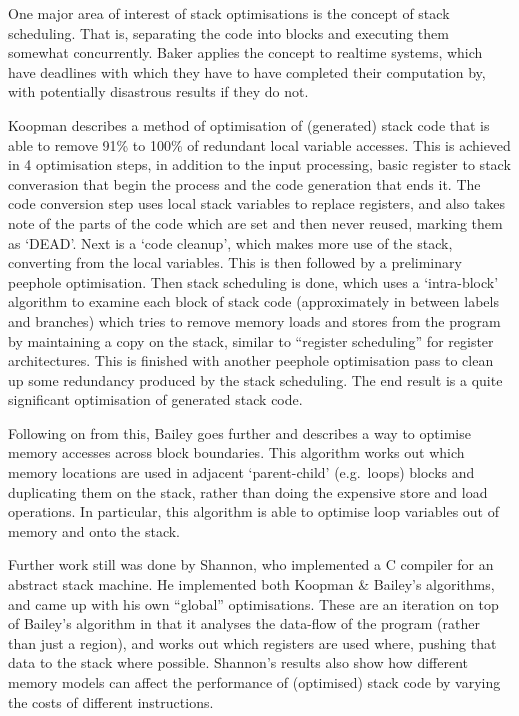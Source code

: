 One major area of interest of stack optimisations is the concept of stack
scheduling. That is, separating the code into blocks and executing them somewhat
concurrently. Baker applies the concept to realtime systems, which have
deadlines with which they have to have completed their computation by, with
potentially disastrous results if they do not.\cite{Baker1991Stack}

Koopman describes a method of optimisation of (generated) stack code that is
able to remove 91\% to 100\% of redundant local variable accesses. This is
achieved in 4 optimisation steps, in addition to the input processing, basic
register to stack converasion that begin the process and the code generation
that ends it. The code conversion step uses local stack variables to replace
registers, and also takes note of the parts of the code which are set and then
never reused, marking them as `DEAD'.  Next is a `code cleanup', which makes
more use of the stack, converting from the local variables. This is then
followed by a preliminary peephole optimisation. Then stack scheduling is done,
which uses a `intra-block' algorithm to examine each block of stack code
(approximately in between labels and branches) which tries to remove memory
loads and stores from the program by maintaining a copy on the stack, similar to
``register scheduling'' for register architectures. This is finished with
another peephole optimisation pass to clean up some redundancy produced by the
stack scheduling. The end result is a quite significant optimisation of
generated stack code.\cite{Koopman1995Preliminary}

Following on from this, Bailey goes further and describes a way to optimise
memory accesses across block boundaries. This algorithm works out which memory
locations are used in adjacent `parent-child' (e.g.\ loops) blocks and
duplicating them on the stack, rather than doing the expensive store and load
operations. In particular, this algorithm is able to optimise loop variables
out of memory and onto the stack.\cite{Bailey2000Inter}

Further work still was done by Shannon, who implemented a C compiler for an
abstract stack machine. He implemented both Koopman \& Bailey's algorithms, and
came up with his own ``global'' optimisations. These are an iteration on top of
Bailey's algorithm in that it analyses the data-flow of the program (rather than
just a region), and works out which registers are used where, pushing that data
to the stack where possible. Shannon's results also show how different memory
models can affect the performance of (optimised) stack code by varying the costs
of different instructions.\cite{Shannon2006AC}

